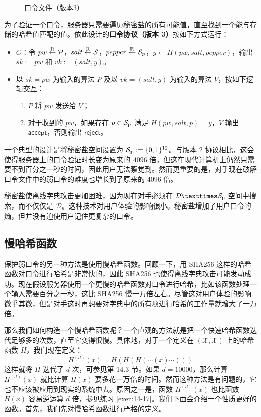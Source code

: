 \begin{figure}
  \centering
  
  \caption{口令文件（版本3）}
  \label{fig:18-5}
\end{figure}

为了验证一个口令，服务器只需要遍历秘密盐的所有可能值，直至找到一个能与存储的哈希值匹配的值。依此设计的\textbf{口令协议（版本 3）}按如下方式运行：
\begin{itemize}
	\item $G$：令 $pw\overset{\rm R}\leftarrow\mathcal{P}$，$salt\overset{\rm R}\leftarrow\mathcal{S}$，$pepper\overset{\rm R}\leftarrow\mathcal{S}_p$，$y\leftarrow H(pw,salt,pepper)$，输出 $sk:=pw$ 和 $vk:=(salt,y)$。
	\item 以 $sk=pw$ 为输入的算法 $P$ 及以 $vk=(salt,y)$ 为输入的算法 $V$，按如下逻辑交互：
	\begin{enumerate}
		\item $P$ 将 $pw$ 发送给 $V$；
		\item 对于收到的 $pw$，如果存在 $p\in\mathcal{S}_{\rm p}$ 满足 $H(pw,salt,p)=y$，$V$ 输出 $\mathsf{accept}$，否则输出 $\mathsf{reject}$。
	\end{enumerate}
\end{itemize}

一个典型的设计是将秘密盐空间设置为 $\mathcal{S}_{\rm p}:=\{0,1\}^{12}$。与版本 2 协议相比，这会使得服务器上的口令验证时长变为原来的 $4096$ 倍，但这在现代计算机上仍然只需要不到百分之一秒的时间，因此用户无法察觉到。然而更重要的是，对手现在破解口令文件中的弱口令的难度也增长到了原来的 $4096$ 倍。

秘密盐使离线字典攻击更加困难，因为现在对手必须在 $\mathcal{D}×\mathcal{S}_{\rm p}$ 空间中搜索，而不仅仅是 $\mathcal{D}$。这种技术对用户体验的影响很小。秘密盐增加了用户口令的熵，但并没有迫使用户记住更复杂的口令。

\subsection{慢哈希函数}

保护弱口令的另一种方法是使用慢哈希函数。回顾一下，用 SHA256 这样的哈希函数对口令进行哈希是非常快的，因此 SHA256 也使得离线字典攻击可能发动成功。现在假设服务器使用一个更慢的哈希函数对口令进行哈希，比如该函数处理一个输入需要百分之一秒，这比 SHA256 慢一万倍左右。尽管这对用户体验的影响微乎其微，但是对手这时再想要对字典中的所有项进行哈希的工作量就增大了一万倍。

那么我们如何构造一个慢哈希函数呢？一个直观的方法就是把一个快速哈希函数迭代足够多的次数，直至它变得很慢。具体地，对于一个定义在 $(\mathcal{X},\mathcal{X})$ 上的哈希函数 $H$，我们现在定义：
\begin{equation}\label{eq:18-5}
	H^{(d)}(x)=H(H(H(\cdots(x)\cdots)))
\end{equation}
这样就将 $H$ 迭代了 $d$ 次，可参见第 14.3 节。如果 $d=10000$，那么计算 $H^{(d)}(x)$ 就比计算 $H(x)$ 要多花一万倍的时间。然而这种方法是有问题的，它也不应该被应用到现实的系统中去。原因之一是，函数 $H^{(d)}(x)$ 也比函数 $H(x)$ 容易逆运算 $d$ 倍，参见练习 \ref{exer:14-17}。我们下面会介绍一个性质更好的函数。首先，我们先对慢哈希函数进行严格的定义。

